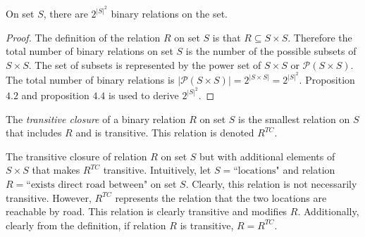 \begin{proposition}
    On set \(S\), there are \(2^{|S|^2}\) binary relations on the set.
\end{proposition}
\begin{proof}
    The definition of the relation \(R\) on set \(S\) is that \(R\subseteq S\times S\). Therefore the total number of binary relations
    on set \(S\) is the number of the possible subsets of \(S\times S\). The set of subsets is represented by the power set of \(S\times S\) 
    or \(\mathcal{P}(S\times S)\). The total number of binary relations is \(|\mathcal{P}(S\times S)|=2^{|S\times S|}=2^{|S|^2}\). Proposition
    \(4.2\) and proposition \(4.4\) is used to derive \(2^{|S|^2}\).
\end{proof}

\bigskip
\begin{definition}
    The \emph{transitive closure} of a binary relation \(R\) on set \(S\) is the smallest relation on \(S\) that 
    includes \(R\) and is transitive. This relation is denoted \(R^{TC}\).
\end{definition}

The transitive closure of relation \(R\) on set \(S\) but with additional elements of \(S\times S\) that makes \(R^{TC}\) transitive. Intuitively, let
\(S=\text{``locations"}\) and relation \(R=\text{``exists direct road between"}\) on set \(S\). Clearly, this relation is not necessarily transitive.
However, \(R^{TC}\) represents the relation that the two locations are reachable by road. This relation is clearly transitive and modifies \(R\).
Additionally, clearly from the definition, if relation \(R\) is transitive, \(R=R^{TC}\).

